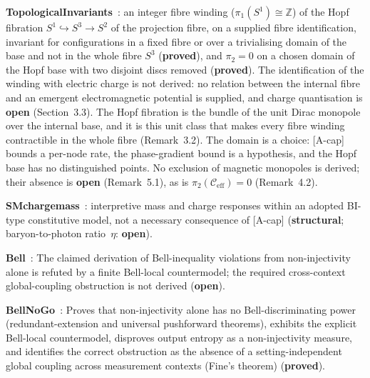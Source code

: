 \documentclass[11pt,a4paper]{article}
\newcommand{\sproved}{\textcolor{cproved}{\textbf{proved}}}
\newcommand{\sstruct}{\textcolor{cstruct}{\textbf{structural}}}
\newcommand{\sopen}{\textcolor{copen}{\textbf{open}}}
\begin{document}
    \textbf{TopologicalInvariants}~\cite{Beau2026k}: an integer fibre winding ($\pi_1(S^1) \cong \mathbb{Z}$)
    of the Hopf fibration $S^1 \hookrightarrow S^3 \to S^2$ of the projection fibre, on a supplied fibre
    identification, invariant for configurations in a fixed fibre or over a trivialising domain of the base and not
    in the whole fibre $S^3$ (\sproved), and $\pi_2 = 0$ on a chosen domain of the Hopf base with two disjoint discs
    removed (\sproved).
    The identification of the winding with electric charge is not derived: no relation between the internal fibre
    and an emergent electromagnetic potential is supplied, and charge quantisation is \sopen{} (Section~3.3).
    The Hopf fibration is the bundle of the unit Dirac monopole over the internal base, and it is this unit class that
    makes every fibre winding contractible in the whole fibre (Remark~3.2).
    The domain is a choice: [A-cap] bounds a per-node rate, the phase-gradient bound is a hypothesis, and the
    Hopf base has no distinguished points.
    No exclusion of magnetic monopoles is derived; their absence is \sopen{} (Remark~5.1), as is
    $\pi_2(\mathcal{C}_{\mathrm{eff}}) = 0$ (Remark~4.2).

    \textbf{SMchargemass}~\cite{Beau2026e}: interpretive mass and charge responses within an adopted
    BI-type constitutive model, not a necessary consequence of [A-cap]
    (\sstruct; baryon-to-photon ratio~$\eta$: \sopen).

    \textbf{Bell}~\cite{Beau2026b}: The claimed derivation of Bell-inequality violations from
    non-injectivity alone is refuted by a finite Bell-local countermodel; the required
    cross-context global-coupling obstruction is not derived (\sopen).

    \textbf{BellNoGo}~\cite{Beau2026BellNoGo}: Proves that non-injectivity alone has no
    Bell-discriminating power (redundant-extension and universal pushforward theorems), exhibits
    the explicit Bell-local countermodel, disproves output entropy as a non-injectivity measure,
    and identifies the correct obstruction as the absence of a setting-independent global
    coupling across measurement contexts (Fine's theorem) (\sproved).
\end{document}
